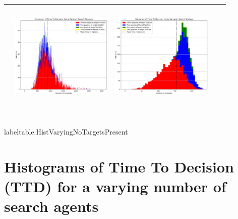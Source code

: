 \begin{landscape}
\begin{table}[h!]
\begin{tabular}{ | c | c | c | c | c |}
\begin{minipage}[c][58mm][c]{49mm}
    \end{minipage}
    &
    \begin{minipage}[c][58mm][c]{49mm}
      \includegraphics[width=49mm, height=52mm]{Chapters/MultiAgentTargetDetection/Figs/Histograms/MultipleTarget/3/3RandomHistogram.png}
    \end{minipage}
    &
    \begin{minipage}[c][58mm][c]{49mm}
      \includegraphics[width=49mm, height=52mm]{Chapters/MultiAgentTargetDetection/Figs/Histograms/MultipleTarget/3/3SaccadicHistogram.png}
    \end{minipage}
    \\
    \hline
   
  \end{tabular}
  \\label{table:HistVaryingNoTargetsPresent}
\end{table}
\break




\section{Histograms of Time To Decision (TTD) for a varying number of search agents}


\end{landscape}
